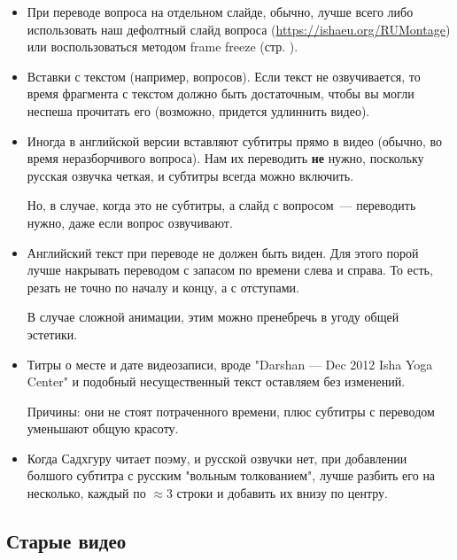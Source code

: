 \documentclass[
a4paper, %
12pt, %
article,
onecolumn, %
openany, %
]{memoir}
\begin{document}
\begin{itemize}
    \item При переводе вопроса на отдельном слайде, обычно, лучше всего 
        либо использовать наш дефолтный слайд вопроса 
(\href{https://ishaeu.org/RUMontage}{https://ishaeu.org/RUMontage}) 
или
        воспользоваться методом frame freeze (стр. \pageref{frame_freeze}).
    \item Вставки с текстом (например, вопросов). Если текст не озвучивается,
        то время фрагмента с текстом должно быть достаточным, чтобы вы могли
        неспеша прочитать его (возможно, придется удлиннить видео).

    \item Иногда в английской версии вставляют субтитры прямо в видео
        {\color{gray}(обычно, во время неразборчивого вопроса)}. Нам их переводить
        \textbf{не} нужно, поскольку русская озвучка четкая,
        и субтитры всегда можно включить.

        Но, в случае, когда это не субтитры, а слайд с вопросом~---
        переводить нужно, даже если вопрос озвучивают.
    \item Английский текст при переводе не должен быть виден. Для этого порой лучше
        накрывать переводом с запасом по времени слева и справа. То есть, резать
        не точно по началу и концу, а с отступами.

        В случае сложной анимации, этим можно пренебречь в угоду общей эстетики.


    \item Титры о месте и дате видеозаписи, вроде "Darshan — Dec 2012
        Isha Yoga Center" и подобный несущественный текст оставляем без изменений.

        {\color{gray} Причины: они не стоят потраченного времени, плюс
        субтитры с переводом уменьшают  общую красоту.}

    \item Когда Садхгуру читает поэму, и русской озвучки нет, при добавлении
        болшого субтитра с русским "вольным толкованием", лучше разбить его на
        несколько, каждый
        по $\approx 3$ строки и добавить их внизу по центру.

\end{itemize}


\subsection{Старые видео}
\end{document}
